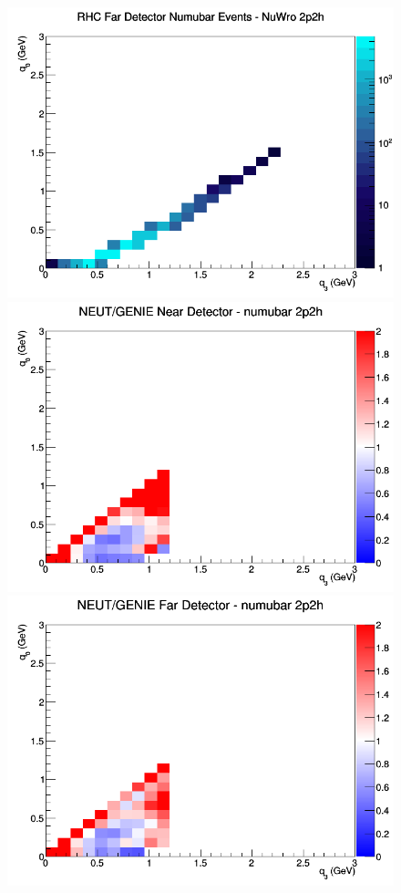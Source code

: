 \documentclass[12pt]{article}
\begin{document}
\begin{figure}[h]
\endminipage
{}
\includegraphics[width=\linewidth]{q0_q3/nominal/2p2h_RHC_FD_numubar_q3_q0_NuWro.png}
\endminipage
\newline
{}
\includegraphics[width=\linewidth]{q0_q3/nominal/ratios/2p2h_NEUT_GENIE_numubar_near_q3_q0.png}
\endminipage
{}
\includegraphics[width=\linewidth]{q0_q3/nominal/ratios/2p2h_NEUT_GENIE_numubar_far_q3_q0.png}

\end{figure}
\end{document}
